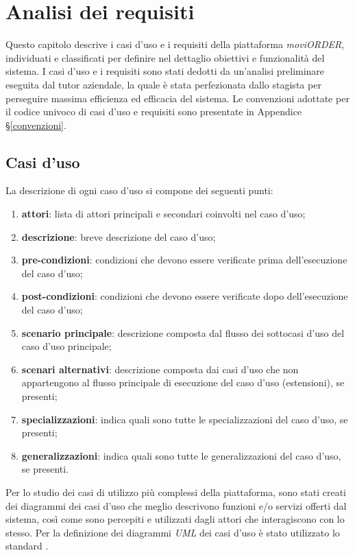 
\chapter{Analisi dei requisiti}
\label{cap:analisi-requisiti}

Questo capitolo descrive i casi d'uso e i requisiti della piattaforma \textit{moviORDER}, individuati e classificati per definire nel dettaglio obiettivi e funzionalità del sistema. I casi d'uso e i requisiti sono stati dedotti da un'analisi preliminare eseguita dal tutor aziendale, la quale è stata perfezionata dallo stagista per perseguire massima efficienza ed efficacia del sistema. Le convenzioni adottate per il codice univoco di casi d'uso e requisiti sono presentate in Appendice §\ref{convenzioni}.

\section{Casi d'uso}

La descrizione di ogni caso d'uso si compone dei seguenti punti:
\begin{enumerate}
	\item \textbf{attori}: lista di attori principali e secondari coinvolti nel caso d'uso;
    \item \textbf{descrizione}: breve descrizione del caso d'uso;
    \item \textbf{pre-condizioni}: condizioni che devono essere verificate prima dell'esecuzione del caso d'uso;
    \item \textbf{post-condizioni}: condizioni che devono essere verificate dopo dell'esecuzione del caso d'uso;
    \item \textbf{scenario principale}: descrizione composta dal flusso dei sottocasi d'uso del caso d'uso principale;
    \item \textbf{scenari alternativi}: descrizione composta dai casi d'uso che non appartengono al flusso
    principale di esecuzione del caso d'uso (estensioni), se presenti;
    \item \textbf{specializzazioni}: indica quali sono tutte le specializzazioni del caso d'uso, se presenti;
    \item \textbf{generalizzazioni}: indica quali sono tutte le generalizzazioni del caso d'uso, se presenti.
\end{enumerate}
Per lo studio dei casi di utilizzo più complessi della piattaforma, sono stati creati dei diagrammi dei casi d'uso che meglio descrivono funzioni e/o servizi offerti dal sistema, così come sono percepiti e utilizzati dagli attori che interagiscono con lo stesso. Per la definizione dei diagrammi \textit{UML} dei casi d'uso è stato utilizzato lo standard . 

